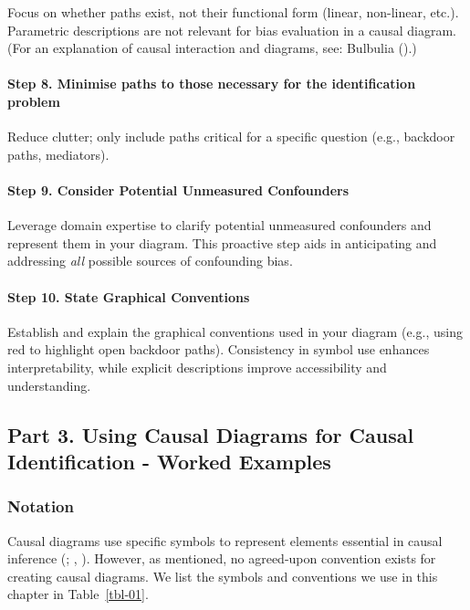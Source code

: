 \documentclass[
  singlecolumn]{article}
\let\oldparagraph\paragraph
\renewcommand{\paragraph}[1]{\oldparagraph{#1}\mbox{}}
\begin{document}
Focus on whether paths exist, not their functional form (linear,
non-linear, etc.). Parametric descriptions are not relevant for bias
evaluation in a causal diagram. (For an explanation of causal
interaction and diagrams, see: Bulbulia
().)

\paragraph{Step 8. Minimise paths to those necessary for the
identification
problem}\label{step-8.-minimise-paths-to-those-necessary-for-the-identification-problem}

Reduce clutter; only include paths critical for a specific question
(e.g., backdoor paths, mediators).

\paragraph{Step 9. Consider Potential Unmeasured
Confounders}\label{step-9.-consider-potential-unmeasured-confounders}

Leverage domain expertise to clarify potential unmeasured confounders
and represent them in your diagram. This proactive step aids in
anticipating and addressing \emph{all} possible sources of confounding
bias.

\paragraph{\texorpdfstring{\textbf{Step 10. State Graphical
Conventions}}{Step 10. State Graphical Conventions}}\label{step-10.-state-graphical-conventions}

Establish and explain the graphical conventions used in your diagram
(e.g., using red to highlight open backdoor paths). Consistency in
symbol use enhances interpretability, while explicit descriptions
improve accessibility and understanding.

\subsection{Part 3. Using Causal Diagrams for Causal Identification -
Worked Examples}\label{section-part3}

\subsubsection{Notation}\label{notation}

Causal diagrams use specific symbols to represent elements essential in
causal inference (; ,
). However, as mentioned, no agreed-upon
convention exists for creating causal diagrams. We list the symbols and
conventions we use in this chapter in Table~\ref{tbl-01}.
\end{document}
